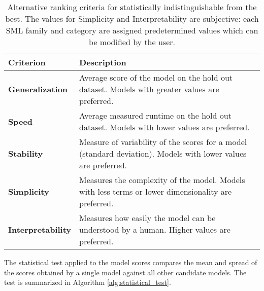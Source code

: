 \begin{table}[here]
	\centering
	\begingroup
	\begin{tabularx}{\textwidth}{| l X |}
	\hline
	Criterion & Description \\
	\hline
	{\bf Generalization} & Average score of the model on the hold out dataset. Models with greater values
	are preferred.\\
	{\bf Speed} & Average measured runtime on the hold out dataset. Models with
	lower values are preferred.\\
	{\bf Stability} & Measure of variability of the scores for a model
	(standard deviation). Models with lower values are preferred. \\
	{\bf Simplicity} &  Measures the complexity of the model. Models with less terms or lower
	dimensionality are preferred.\\
	{\bf Interpretability} & Measures how easily the model can be understood by a human. Higher values are
	preferred.\\
	\hline
	\end{tabularx}
	\endgroup
	\caption[Alternative model ranking criteria]{Alternative ranking
	criteria for statistically indistinguishable from the best. 
	The values for Simplicity and Interpretability are subjective: each SML family and category are
	assigned predetermined values which can be modified by the user.
	}
	\label{tab:ranking}
\end{table}


%
%
%

The statistical test applied to the model scores compares the mean and spread of the scores
obtained by a single model against all other candidate models. The test is summarized in Algorithm
\ref{alg:statistical_test}.

